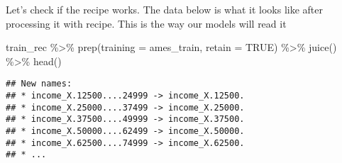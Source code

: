 \documentclass[
]{article}
\newenvironment{Shaded}{\begin{snugshade}}{\end{snugshade}}
\newcommand{\AttributeTok}[1]{\textcolor[rgb]{0.77,0.63,0.00}{#1}}
\newcommand{\ConstantTok}[1]{\textcolor[rgb]{0.00,0.00,0.00}{#1}}
\newcommand{\FunctionTok}[1]{\textcolor[rgb]{0.00,0.00,0.00}{#1}}
\newcommand{\NormalTok}[1]{#1}
\newcommand{\SpecialCharTok}[1]{\textcolor[rgb]{0.00,0.00,0.00}{#1}}
\begin{document}
Let's check if the recipe works. The data below is what it looks like
after processing it with recipe. This is the way our models will read it

\begin{Shaded}
\begin{Highlighting}[]
\NormalTok{train\_rec }\SpecialCharTok{\%\textgreater{}\%} 
\FunctionTok{prep}\NormalTok{(}\AttributeTok{training =}\NormalTok{ ames\_train, }\AttributeTok{retain =} \ConstantTok{TRUE}\NormalTok{) }\SpecialCharTok{\%\textgreater{}\%}
\FunctionTok{juice}\NormalTok{() }\SpecialCharTok{\%\textgreater{}\%}
\FunctionTok{head}\NormalTok{()}
\end{Highlighting}
\end{Shaded}

\begin{verbatim}
## New names:
## * income_X.12500....24999 -> income_X.12500.
## * income_X.25000....37499 -> income_X.25000.
## * income_X.37500....49999 -> income_X.37500.
## * income_X.50000....62499 -> income_X.50000.
## * income_X.62500....74999 -> income_X.62500.
## * ...
\end{verbatim}
\end{document}
